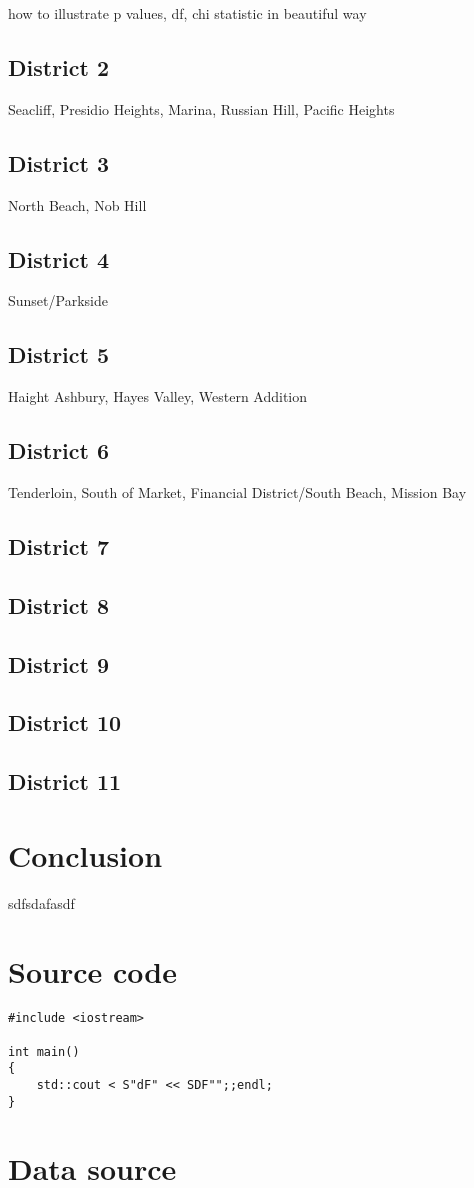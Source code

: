 \documentclass[]{article}
\begin{document}
how to illustrate p values, df, chi statistic in beautiful way

\subsection{District 2}
Seacliff, Presidio Heights, Marina, Russian Hill, Pacific Heights
\subsection{District 3}
North Beach, Nob Hill
\subsection{District 4}
Sunset/Parkside
\subsection{District 5}
Haight Ashbury, Hayes Valley, Western Addition
\subsection{District 6}
Tenderloin, South of Market, Financial District/South Beach, Mission Bay
\subsection{District 7}
\subsection{District 8}
\subsection{District 9}
\subsection{District 10}
\subsection{District 11}
\section{Conclusion}
sdfsdafasdf
\newpage
\appendix
\section{Source code}
\begin{lstlisting}
#include <iostream>

int main()
{
	std::cout < S"dF" << SDF"";;endl;
}
\end{lstlisting}

\section{Data source}
\end{document}
